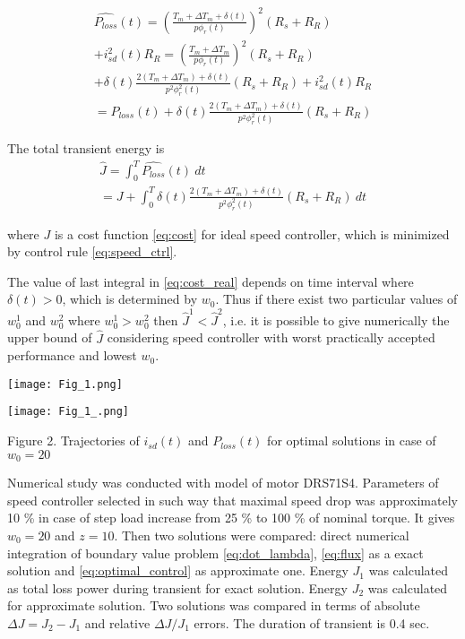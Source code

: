 \documentclass[journal]{IEEEtran}
\begin{document}
\begin{equation}\label{eq:P_loss_real}
\begin{gathered}
\widehat{P_{loss}}(t) = \left ( \frac{T_m + \Delta T_m + \delta(t)}{p \phi_r(t)} \right )^2 (R_s + R_R) \\
+ i_{sd}^2(t) R_R = \left ( \frac{T_m + \Delta T_m}{p \phi_r(t)} \right )^2 (R_s + R_R) \\
+ \delta(t) \frac{2(T_m + \Delta T_m) + \delta(t)}{p^2 \phi_r^2(t)} (R_s + R_R) + i_{sd}^2(t) R_R \\
= P_{loss}(t) + \delta(t) \frac{2(T_m + \Delta T_m) + \delta(t)}{p^2 \phi_r^2(t)} (R_s + R_R)
\end{gathered}
\end{equation}

The total transient energy is 
\begin{equation}\label{eq:cost_real}
\begin{gathered}
\widehat{J} = \int_0^T \widehat{P_{loss}}(t) ~ dt \\ 
= J + \int_0^T \delta(t) \frac{2(T_m + \Delta T_m) + \delta(t)}{p^2 \phi_r^2(t)} (R_s + R_R) ~ dt
\end{gathered}
\end{equation}

where $J$ is a cost function \eqref{eq:cost} for ideal speed controller, which is minimized by control rule \eqref{eq:speed_ctrl}.

The value of last integral in \eqref{eq:cost_real} depends on time interval where $\delta(t) > 0$, which is determined by $w_0$. Thus if there exist two particular values of $w_0^1$ and $w_0^2$ where $w_0^1 > w_0^2$ then $\widehat{J}^1 < \widehat{J}^2$, i.e. it is possible to give numerically the upper bound of $\widehat{J}$ considering speed controller with worst practically accepted performance and lowest $w_0$.

\begin{center}
\ifpdf \texttt{[image: Fig\_1.png]}
\fi

\ifpdf \texttt{[image: Fig\_1\_.png]}
\fi

Figure 2. Trajectories of $i_{sd}(t)$ and $P_{loss}(t)$ for optimal solutions in case of $w_0 = 20$
\end{center}

Numerical study was conducted with model of motor DRS71S4. Parameters of speed controller selected in such way that maximal speed drop was approximately 10 \% in case of step load increase from 25 \% to 100 \% of nominal torque. It gives $w_0 = 20$ and $z = 10$. Then two solutions were compared: direct numerical integration of boundary value problem \eqref{eq:dot_lambda}, \eqref{eq:flux} as a exact solution and \eqref{eq:optimal_control} as approximate one. Energy $J_1$ was calculated as total loss power during transient for exact solution. Energy $J_2$ was calculated for approximate solution. Two solutions was compared in terms of absolute $\Delta J = J_2 - J_1$ and relative $\Delta J/J_1$ errors. The duration of transient is 0.4 sec. 
\end{document}
